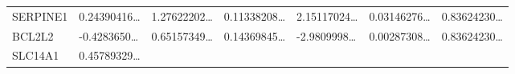 \documentclass[
]{article}
\begin{document}
\begin{longtable}[]{@{}lllllll@{}}
\begin{minipage}[t]{0.08\columnwidth}
SERPINE1\strut
\end{minipage} & \begin{minipage}[t]{0.12\columnwidth}\raggedright
0.24390416\ldots{}\strut
\end{minipage} & \begin{minipage}[t]{0.12\columnwidth}\raggedright
1.27622202\ldots{}\strut
\end{minipage} & \begin{minipage}[t]{0.12\columnwidth}\raggedright
0.11338208\ldots{}\strut
\end{minipage} & \begin{minipage}[t]{0.12\columnwidth}\raggedright
2.15117024\ldots{}\strut
\end{minipage} & \begin{minipage}[t]{0.12\columnwidth}\raggedright
0.03146276\ldots{}\strut
\end{minipage} & \begin{minipage}[t]{0.12\columnwidth}\raggedright
0.83624230\ldots{}\strut
\end{minipage}\tabularnewline
\begin{minipage}[t]{0.08\columnwidth}\raggedright
BCL2L2\strut
\end{minipage} & \begin{minipage}[t]{0.12\columnwidth}\raggedright
-0.4283650\ldots{}\strut
\end{minipage} & \begin{minipage}[t]{0.12\columnwidth}\raggedright
0.65157349\ldots{}\strut
\end{minipage} & \begin{minipage}[t]{0.12\columnwidth}\raggedright
0.14369845\ldots{}\strut
\end{minipage} & \begin{minipage}[t]{0.12\columnwidth}\raggedright
-2.9809998\ldots{}\strut
\end{minipage} & \begin{minipage}[t]{0.12\columnwidth}\raggedright
0.00287308\ldots{}\strut
\end{minipage} & \begin{minipage}[t]{0.12\columnwidth}\raggedright
0.83624230\ldots{}\strut
\end{minipage}\tabularnewline
\begin{minipage}[t]{0.08\columnwidth}\raggedright
SLC14A1\strut
\end{minipage} & \begin{minipage}[t]{0.12\columnwidth}\raggedright
0.45789329\ldots{}\strut
\end{minipage} & \begin{minipage}[t]{0.12\columnwidth}\raggedright

\end{minipage}
\end{longtable}
\end{document}
